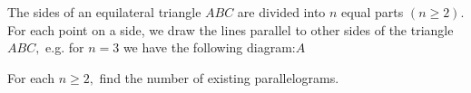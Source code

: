 The sides of an equilateral triangle $ABC$ are divided into $n$ equal parts $(n \geq 2) .$ For each point on a side, we draw the lines parallel to other sides of the triangle $ABC,$ e.g. for $n=3$ we have the following diagram:$A$

For each $n \geq 2,$ find the number of existing parallelograms.